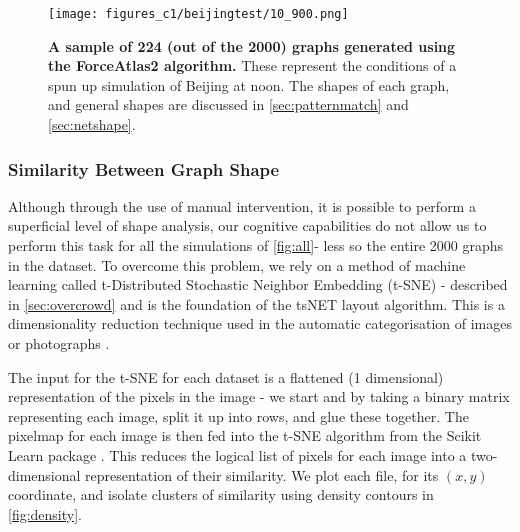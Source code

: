    \begin{figure}[H]
         \centering
     \texttt{[image: figures\_c1/beijingtest/10\_900.png]}
     \caption{\textbf{A sample of 224 (out of the 2000) graphs generated using the ForceAtlas2 algorithm.} These represent the conditions of a spun up simulation of Beijing at noon. The shapes of each graph, and general shapes are discussed in \autoref{sec:patternmatch} and \autoref{sec:netshape}.}
     \label{fig:all}
     \end{figure}
 





\subsubsection{Similarity Between Graph Shape}\label{sec:patternmatch}
Although through the use of manual intervention, it is possible to perform a superficial level of shape analysis, our cognitive capabilities do not allow us to perform this task for all the simulations of \autoref{fig:all}- less so the entire 2000 graphs in the dataset. To overcome this problem, we rely on a method of machine learning called t-Distributed Stochastic Neighbor Embedding (t-SNE) - described in \autoref{sec:overcrowd} and is the foundation of the tsNET layout algorithm. This is a dimensionality reduction technique used in the automatic categorisation of images or photographs \citep{truthandbeauty,sketchy}. 

The input for the t-SNE for each dataset is a flattened (1 dimensional) representation of the pixels in the image - we start and by taking a binary matrix representing each image, split it up into rows, and glue these together. The pixelmap for each image is then fed into the t-SNE algorithm from the Scikit Learn package \citep{scikit-learn}. This reduces the logical list of pixels for each image into a two-dimensional representation of their similarity. We plot each file, for its $(x,y)$ coordinate, and isolate clusters of similarity using density contours in \autoref{fig:density}. 

